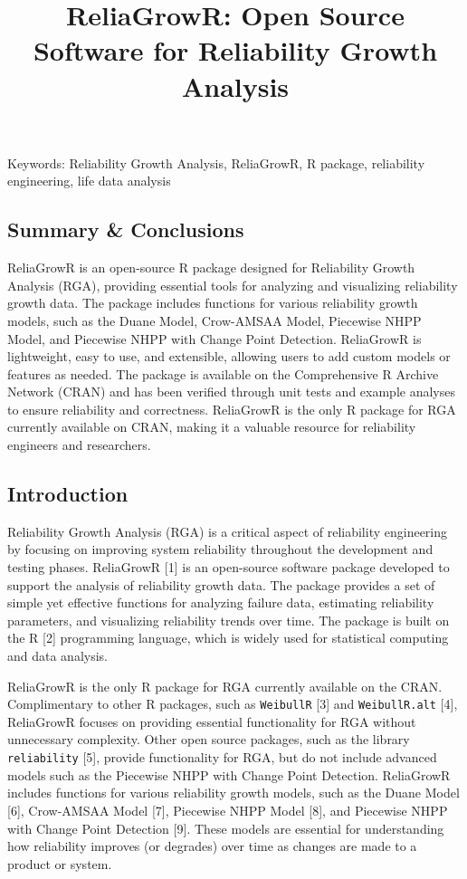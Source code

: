 \documentclass[
]{article}
\title{ReliaGrowR: Open Source Software for Reliability Growth Analysis}
\author{}
\date{\vspace{-2.5em}}
\begin{document}
\maketitle

Keywords: Reliability Growth Analysis, ReliaGrowR, R package,
reliability engineering, life data analysis

\subsection{Summary \& Conclusions}\label{summary-conclusions}

ReliaGrowR is an open-source R package designed for Reliability Growth
Analysis (RGA), providing essential tools for analyzing and visualizing
reliability growth data. The package includes functions for various
reliability growth models, such as the Duane Model, Crow-AMSAA Model,
Piecewise NHPP Model, and Piecewise NHPP with Change Point Detection.
ReliaGrowR is lightweight, easy to use, and extensible, allowing users
to add custom models or features as needed. The package is available on
the Comprehensive R Archive Network (CRAN) and has been verified through
unit tests and example analyses to ensure reliability and correctness.
ReliaGrowR is the only R package for RGA currently available on CRAN,
making it a valuable resource for reliability engineers and researchers.

\subsection{Introduction}\label{introduction}

Reliability Growth Analysis (RGA) is a critical aspect of reliability
engineering by focusing on improving system reliability throughout the
development and testing phases. ReliaGrowR {[}1{]} is an open-source
software package developed to support the analysis of reliability growth
data. The package provides a set of simple yet effective functions for
analyzing failure data, estimating reliability parameters, and
visualizing reliability trends over time. The package is built on the R
{[}2{]} programming language, which is widely used for statistical
computing and data analysis.

ReliaGrowR is the only R package for RGA currently available on the
CRAN. Complimentary to other R packages, such as \texttt{WeibullR}
{[}3{]} and \texttt{WeibullR.alt} {[}4{]}, ReliaGrowR focuses on
providing essential functionality for RGA without unnecessary
complexity. Other open source packages, such as the library
\texttt{reliability} {[}5{]}, provide functionality for RGA, but do not
include advanced models such as the Piecewise NHPP with Change Point
Detection. ReliaGrowR includes functions for various reliability growth
models, such as the Duane Model {[}6{]}, Crow-AMSAA Model {[}7{]},
Piecewise NHPP Model {[}8{]}, and Piecewise NHPP with Change Point
Detection {[}9{]}. These models are essential for understanding how
reliability improves (or degrades) over time as changes are made to a
product or system.
\end{document}
